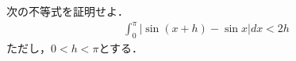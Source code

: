 \documentclass[../../main.tex]{subfiles}
\begin{document}
次の不等式を証明せよ．
\begin{align}
  \int_0^\pi|\sin(x+h)-\sin x|dx<2h
\end{align}
ただし，$0<h<\pi$とする．
\end{document}
